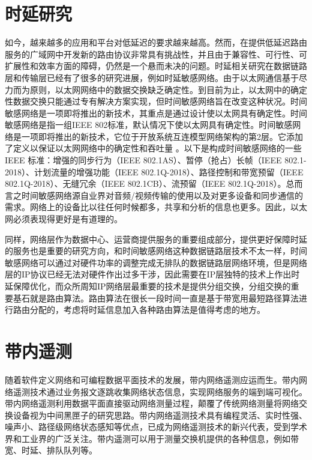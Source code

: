 \section{时延研究}

如今，越来越多的应用和平台对低延迟的要求越来越高。然而，在提供低延迟路由服务的广域网中开发新的路由协议非常具有挑战性，并且由于兼容性、可行性、可扩展性和效率方面的障碍，仍然是一个悬而未决的问题。时延相关研究在数据链路层和传输层已经有了很多的研究进展，例如时延敏感网络。由于以太网通信基于尽力而为原则，以太网网络中的数据交换缺乏确定性。到目前为止，以太网中的确定性数据交换只能通过专有解决方案实现，但时间敏感网络旨在改变这种状况。时间敏感网络是一项即将推出的新技术，其重点是通过设计使以太网具有确定性。时间敏感网络是指一组IEEE 802标准，默认情况下使以太网具有确定性。时间敏感网络是一项即将推出的新技术，它位于开放系统互连模型网络架构的第2层。它添加了定义以保证以太网网络中的确定性和吞吐量 \cite{TSN1, TSN2, TSN3} 。以下是构成时间敏感网络的一些 IEEE 标准：增强的同步行为（IEEE 802.1AS）、暂停（抢占）长帧（IEEE 802.1-2018）、计划流量的增强功能（IEEE 802.1Q-2018）、路径控制和带宽预留（IEEE 802.1Q-2018）、无缝冗余（IEEE 802.1CB）、流预留（IEEE 802.1Q-2018）。总而言之时间敏感网络源自业界对音频/视频传输的使用以及对更多设备和同步通信的需求。网络上的设备比以往任何时候都多，共享和分析的信息也更多。因此，以太网必须表现得更好是有道理的。

同样，网络层作为数据中心、运营商提供服务的重要组成部分，提供更好保障时延的服务也是重要的研究方向，和时间敏感网络这种数据链路层技术不太一样，时间敏感网络可以通过对硬件功率的调整完成无排队的数据链路层网络环境，但是网络层的IP协议已经无法对硬件作出过多干涉，因此需要在IP层独特的技术上作出时延保障优化，而众所周知IP网络层最重要的技术是提供分组交换，分组交换的重要基石就是路由算法。路由算法在很长一段时间一直是基于带宽用最短路径算法进行路由分配的，考虑将时延信息加入各种路由算法是值得考虑的地方。

\section{带内遥测}

随着软件定义网络和可编程数据平面技术的发展，带内网络遥测应运而生。带内网络遥测技术通过业务报文逐跳收集网络状态信息，实现网络服务的端到端可视化。带内网络遥测利用数据平面直接驱动网络测量过程，颠覆了传统网络测量将网络交换设备视为中间黑匣子的研究思路。带内网络遥测技术具有编程灵活、实时性强、噪声小、路径级网络状态感知等优点，已成为网络遥测技术的新兴代表，受到学术界和工业界的广泛关注。带内遥测可以用于测量交换机提供的各种信息，例如带宽、时延、排队队列等。

